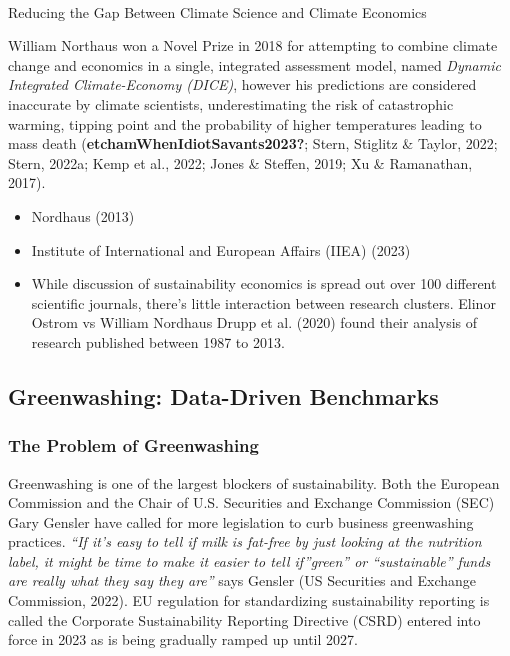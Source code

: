 \documentclass[
  letterpaper,
  DIV=11,
  numbers=noendperiod]{scrartcl}
\makeatletter
\let\oldparagraph\paragraph
\renewcommand{\paragraph}{
    \@ifstar
      \xxxParagraphStar
      \xxxParagraphNoStar
  }
\newcommand{\xxxParagraphStar}[1]{\oldparagraph*{#1}\mbox{}}
\newcommand{\xxxParagraphNoStar}[1]{\oldparagraph{#1}\mbox{}}
\providecommand{\tightlist}{%
  \setlength{\itemsep}{0pt}\setlength{\parskip}{0pt}}\usepackage{longtable,booktabs,array}
\makeatother
\begin{document}
\paragraph{Reducing the Gap Between Climate Science and Climate
Economics}\label{reducing-the-gap-between-climate-science-and-climate-economics}

William Northaus won a Novel Prize in 2018 for attempting to combine
climate change and economics in a single, integrated assessment model,
named \emph{Dynamic Integrated Climate-Economy (DICE)}, however his
predictions are considered inaccurate by climate scientists,
underestimating the risk of catastrophic warming, tipping point and the
probability of higher temperatures leading to mass death
(\textbf{etchamWhenIdiotSavants2023?}; Stern, Stiglitz \& Taylor, 2022;
Stern, 2022a; Kemp et al., 2022; Jones \& Steffen, 2019; Xu \&
Ramanathan, 2017).

\begin{itemize}
\tightlist
\item
  Nordhaus (2013)
\item
  Institute of International and European Affairs (IIEA) (2023)
\item
  While discussion of sustainability economics is spread out over 100
  different scientific journals, there's little interaction between
  research clusters. Elinor Ostrom vs William Nordhaus Drupp et al.
  (2020) found their analysis of research published between 1987 to
  2013.
\end{itemize}

\subsection{Greenwashing: Data-Driven
Benchmarks}\label{greenwashing-data-driven-benchmarks}

\subsubsection{The Problem of
Greenwashing}\label{the-problem-of-greenwashing}

Greenwashing is one of the largest blockers of sustainability. Both the
European Commission and the Chair of U.S. Securities and Exchange
Commission (SEC) Gary Gensler have called for more legislation to curb
business greenwashing practices. \emph{``If it's easy to tell if milk is
fat-free by just looking at the nutrition label, it might be time to
make it easier to tell if''green'' or ``sustainable'' funds are really
what they say they are''} says Gensler (US Securities and Exchange
Commission, 2022). EU regulation for standardizing sustainability
reporting is called the Corporate Sustainability Reporting Directive
(CSRD) entered into force in 2023 as is being gradually ramped up until
2027.
\end{document}
